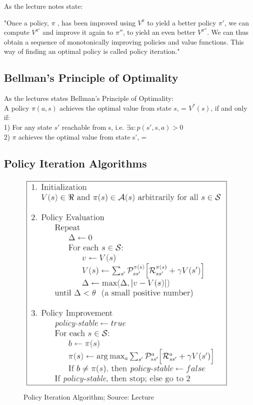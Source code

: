 As the lecture notes state:

"Once a policy, $\pi$ , has been improved using $V^{\pi}$ to yield a better policy $\pi'$, we can compute $V^{\pi'}$ and improve it again to $\pi''$, to yield an even better $V^{\pi''}$. We can thus obtain a sequence of monotonically improving policies and value functions. This way of finding an optimal policy is called policy iteration."

\subsection{Bellman's Principle of Optimality}

As the lectures states Bellman's Principle of Optimality:\\

A policy $\pi(a, s)$ achieves the optimal value from state $s$,  = $V^{*}(s)$, if and only if:\\ 
1) For any state $s'$ reachable from s, i.e. $\exists a : p(s', s, a) > 0$\\
2) $\pi$ achieves the optimal value from state s',  = 
 
 \newpage
 
\subsection{Policy Iteration Algorithms}

\begin{figure}[h!]
  \centering
  \includegraphics[scale=0.5]{figures/policy_iteration_algorithm.PNG}
  \caption{Policy Iteration Algorithm; Source: Lecture}
  \label{fig:pia}
\end{figure}

